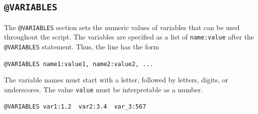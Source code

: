 \documentclass[11pt]{article}
\newcommand{\scr}[1]{\lstinline|#1|}
\begin{document}
\subsection{\scr{@VARIABLES}}
\label{sec:variables}
The \scr{@VARIABLES} section sets the numeric values of variables that can be used throughout the script. The variables are specified as a list of \scr{name:value} after the  \scr{@VARIABLES} statement. Thus, the line has the form 
\begin{center}
	\scr{@VARIABLES name1:value1, name2:value2, ...}
\end{center}
The variable names must start with a letter, followed by letters, digits, or underscores.
The value \scr{value} must be interpretable as a number.

\begin{lstlisting}[caption={@VARIABLES example}]
@VARIABLES var1:1.2  var2:3.4  var_3:567
\end{lstlisting}
\end{document}
